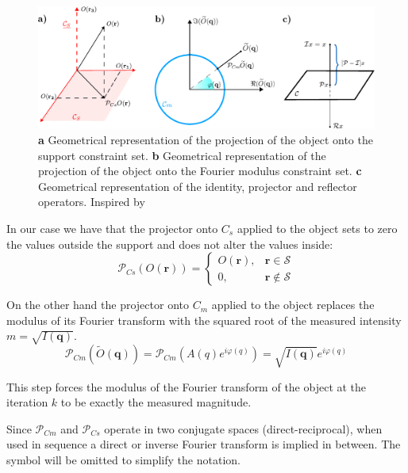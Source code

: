 \begin{figure}[H]
    \centering
    \includegraphics[width=\textwidth]{figures/Intro/projections.pdf}
    \caption{\textbf{a} Geometrical representation of the projection of the object onto the support constraint set.  
    \textbf{b} Geometrical representation of the projection of the object onto the Fourier modulus constraint set.
    \textbf{c} Geometrical representation of the identity, projector and reflector operators. Inspired by \cite{marchesini_unified_2007}}
    \label{fig:projections}
\end{figure}

In our case we have that the projector onto $C_s$ applied to the object sets to zero the values outside the support and does not 
alter the values inside: 
\begin{equation}
    \mathcal{P}_{Cs}(O(\mathbf{r})) = 
    \begin{cases}
        O(\mathbf{r}), & \mathbf{r} \in \mathcal{S} \\
        0,  &  \mathbf{r} \notin \mathcal{S}
     \end{cases}
\end{equation}

On the other hand the projector onto $C_m$ applied to the object replaces the modulus of its Fourier transform with the 
squared root of the measured intensity $m = \sqrt{I(\mathbf{q})}$. 
\begin{equation}
    \mathcal{P}_{Cm}(\widetilde{O}(\mathbf{q})) = \mathcal{P}_{Cm}(A(q)e^{i\varphi(q)}) = \sqrt{I(\mathbf{q})}e^{i\varphi(q)}
    \label{eq:modulus_projection}
\end{equation}

This step forces the modulus of the Fourier transform of the object at the iteration $k$ to be exactly the measured magnitude.  

Since $\mathcal{P}_{Cm}$ and $\mathcal{P}_{Cs}$ operate in two conjugate spaces (direct-reciprocal), when used in sequence 
a direct or inverse Fourier transform is implied in between. The symbol will be omitted to simplify the notation. 

